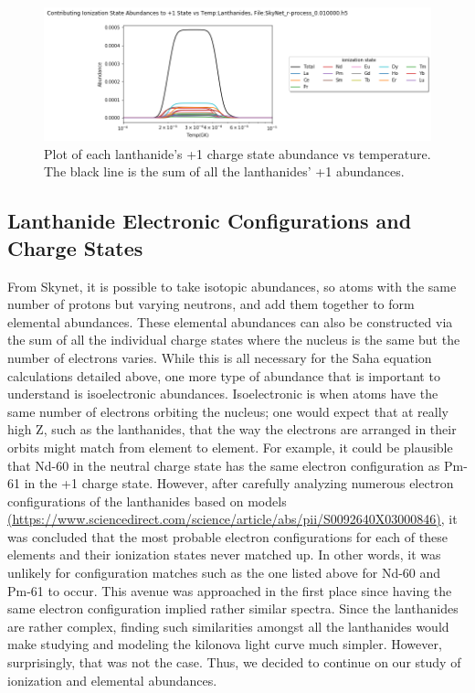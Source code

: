 \documentclass[11pt,a4paper]{article}
\begin{document}
\begin{figure}[h!]
  \includegraphics[scale = .6]{plus_one.png}
  \caption{Plot of each lanthanide's +1 charge state abundance vs temperature. The black line is the sum of all the lanthanides' +1 abundances. }
\end{figure} 

\pagebreak
 
\subsection{Lanthanide Electronic Configurations and Charge States}

From Skynet, it is possible to take isotopic abundances, so atoms with the same number of protons but varying neutrons, and add them together to form elemental abundances. These elemental abundances can also be constructed via the sum of all the individual charge states where the nucleus is the same but the number of electrons varies. While this is all necessary for the Saha equation calculations detailed above, one more type of abundance that is important to understand is isoelectronic abundances. Isoelectronic is when atoms have the same number of electrons orbiting the nucleus; one would expect that at really high Z, such as the lanthanides, that the way the electrons are arranged in their orbits might match from element to element. For example, it could be plausible that Nd-60 in the neutral charge state has the same electron configuration as Pm-61 in the +1 charge state. However, after carefully analyzing numerous electron configurations of the lanthanides based on models \url{(https://www.sciencedirect.com/science/article/abs/pii/S0092640X03000846)}, it was concluded that the most probable electron configurations for each of these elements and their ionization states never matched up. In other words, it was unlikely for configuration matches such as the one listed above for Nd-60 and Pm-61 to occur.
This avenue was approached in the first place since having the same electron configuration implied rather similar spectra. Since the lanthanides are rather complex, finding such similarities amongst all the lanthanides would make studying and modeling the kilonova light curve much simpler. However, surprisingly, that was not the case. Thus, we decided to continue on our study of ionization and elemental abundances.
\end{document}

